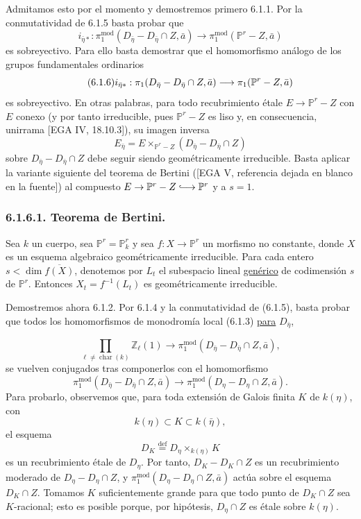 \pageoriginale

Admitamos esto por el momento y demostremos primero 6.1.1. Por la
conmutatividad de 6.1.5 basta probar que
\[
i_{\bar\eta*}:
\pi_1^{\mathrm{mod}}(D_{\bar\eta}-D_{\bar\eta}\cap Z,\bar a)
\longrightarrow
\pi_1^{\mathrm{mod}}(\mathbb P^r-Z,\bar a)
\]
es sobreyectivo. Para ello basta demostrar que el homomorfismo análogo
de los grupos fundamentales ordinarios
\begin{equation}\tag{6.1.6}
\sisi{i_{\bar\eta}}{i_{\bar\eta*}}:
\pi_1(D_{\bar\eta}-D_{\bar\eta}\cap Z,\bar a)
\longrightarrow
\pi_1(\mathbb P^r-Z,\bar a)
\end{equation}
es sobreyectivo. En otras palabras, para todo recubrimiento étale
$E\to\mathbb P^r-Z$ con $E$ conexo (y por tanto irreducible, pues
$\mathbb P^r-Z$ es liso y, en consecuencia, unirrama
[EGA IV, 18.10.3]), su imagen inversa
\[
E_{\bar\eta}
=E\times_{\mathbb P^r-Z}(D_{\bar\eta}-D_{\bar\eta}\cap Z)
\]
sobre $D_{\bar\eta}-D_{\bar\eta}\cap Z$ debe seguir siendo
geométricamente irreducible. Basta aplicar la variante siguiente del
teorema de Bertini ([EGA V, referencia dejada en blanco en la fuente])
al compuesto
$E\to\mathbb P^r-Z\lhook\joinrel\longrightarrow\mathbb P^r$ y a $s=1$.

\subsubsection*{6.1.6.1. Teorema de Bertini.}

Sea $k$ un cuerpo, sea $\mathbb P^r=\mathbb P^r_k$ y sea
$f:X\to\mathbb P^r$ un morfismo no constante, donde $X$ es un esquema
algebraico geométricamente irreducible. Para cada entero
$s<\dim\overline{f(X)}$, denotemos por $L_t$ el subespacio lineal
\underline{genérico} de codimensión $s$ de $\mathbb P^r$. Entonces
$X_t=f^{-1}(L_t)$ es geométricamente irreducible.

Demostremos ahora 6.1.2. Por 6.1.4 y la conmutatividad de (6.1.5), basta
probar que todos los homomorfismos de monodromía local (6.1.3)
\underline{para} $D_{\bar\eta}$,

\pageoriginale

\begin{equation}\tag{6.1.7.1}
\prod_{\ell\ne\operatorname{char}(k)}\mathbb Z_\ell(1)
\longrightarrow
\pi_1^{\mathrm{mod}}(D_{\bar\eta}-D_{\bar\eta}\cap Z,\bar a),
\end{equation}
se vuelven conjugados tras componerlos con el homomorfismo
\begin{equation}\tag{6.1.7.2}
\pi_1^{\mathrm{mod}}(D_{\bar\eta}-D_{\bar\eta}\cap Z,\bar a)
\longrightarrow
\pi_1^{\mathrm{mod}}(D_\eta-D_\eta\cap Z,\bar a).
\end{equation}
Para probarlo, observemos que, para toda extensión de Galois finita
$K$ de $k(\eta)$, con
\[
k(\eta)\subset K\subset k(\bar\eta),
\]
el esquema
\[
D_K\stackrel{\mathrm{def}}{=}D_\eta\times_{k(\eta)}K
\]
es un recubrimiento étale de $D_\eta$. Por tanto,
$D_K-D_K\cap Z$ es un recubrimiento moderado de
$D_\eta-D_\eta\cap Z$, y
$\pi_1^{\mathrm{mod}}(D_\eta-D_\eta\cap Z,\bar a)$ actúa sobre el
esquema $D_K\cap Z$. Tomamos $K$ suficientemente grande para que todo
punto de $D_K\cap Z$ sea $K$-racional; esto es posible porque, por
hipótesis, $D_\eta\cap Z$ es étale sobre $k(\eta)$.

